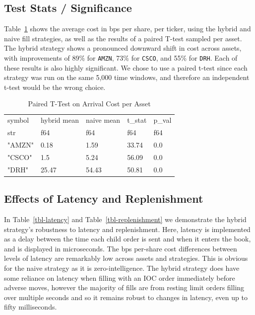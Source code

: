 \documentclass[
  letterpaper,
]{article}
\begin{document}
\subsection{Test Stats / Significance}\label{sec-tstat}

Table~\ref{tbl-tstat} shows the average cost in bps per share, per
ticker, using the hybrid and naive fill strategies, as well as the
results of a paired T-test sampled per asset. The hybrid strategy shows
a pronounced downward shift in cost across assets, with improvements of
89\% for \texttt{AMZN}, 73\% for \texttt{CSCO}, and 55\% for
\texttt{DRH}. Each of these results is also highly significant. We chose
to use a paired t-test since each strategy was run on the same 5,000
time windows, and therefore an independent t-test would be the wrong
choice.

\begin{longtable}[]{@{}lllll@{}}

\caption{\label{tbl-tstat}Paired T-Test on Arrival Cost per Asset}

\tabularnewline

\toprule\noalign{}
symbol & hybrid mean & naive mean & t\_stat & p\_val \\
str & f64 & f64 & f64 & f64 \\
\midrule\noalign{}
\endhead
\bottomrule\noalign{}
\endlastfoot
"AMZN" & 0.18 & 1.59 & 33.74 & 0.0 \\
"CSCO" & 1.5 & 5.24 & 56.09 & 0.0 \\
"DRH" & 25.47 & 54.43 & 50.81 & 0.0 \\

\end{longtable}

\subsection{Effects of Latency and
Replenishment}\label{effects-of-latency-and-replenishment}

In Table~\ref{tbl-latency} and Table~\ref{tbl-replenishment} we
demonstrate the hybrid strategy's robustness to latency and
replenishment. Here, latency is implemented as a delay between the time
each child order is sent and when it enters the book, and is displayed
in microseconds. The bps per-share cost differences between levels of
latency are remarkably low across assets and strategies. This is obvious
for the naive strategy as it is zero-intelligence. The hybrid strategy
does have some reliance on latency when filling with an IOC order
immediately before adverse moves, however the majority of fills are from
resting limit orders filling over multiple seconds and so it remains
robust to changes in latency, even up to fifty milliseconds.
\end{document}
